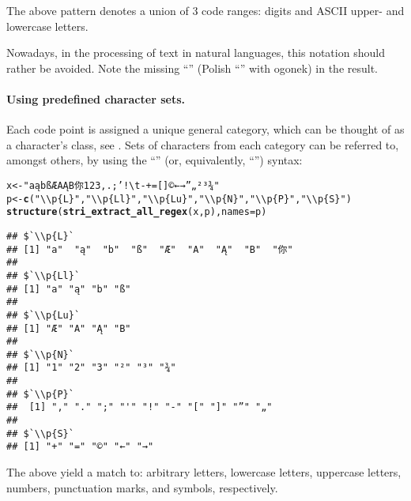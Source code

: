 \documentclass[nojss]{jss}\usepackage[]{graphicx}\usepackage[]{xcolor}
\makeatletter
\newcommand{\hlstr}[1]{\textcolor[rgb]{0.192,0.494,0.8}{#1}}%
\newcommand{\hlstd}[1]{\textcolor[rgb]{0.345,0.345,0.345}{#1}}%
\newcommand{\hlkwb}[1]{\textcolor[rgb]{0.69,0.353,0.396}{#1}}%
\newcommand{\hlkwc}[1]{\textcolor[rgb]{0.333,0.667,0.333}{#1}}%
\newcommand{\hlkwd}[1]{\textcolor[rgb]{0.737,0.353,0.396}{\textbf{#1}}}%
\newenvironment{kframe}{%
 \def\at@end@of@kframe{}%
 \ifinner\ifhmode%
  \def\at@end@of@kframe{\end{minipage}}%
  \begin{minipage}{\columnwidth}%
 \fi\fi%
 \def\FrameCommand##1{\hskip\@totalleftmargin \hskip-\fboxsep
 \colorbox{shadecolor}{##1}\hskip-\fboxsep
     \hskip-\linewidth \hskip-\@totalleftmargin \hskip\columnwidth}%
 \MakeFramed {\advance\hsize-\width
   \@totalleftmargin\z@ \linewidth\hsize
   \@setminipage}}%
 {\par\unskip\endMakeFramed%
 \at@end@of@kframe}
\newenvironment{knitrout}{}{} %
\makeatother
\begin{document}
The above pattern denotes a union of 3 code ranges:
digits and ASCII upper- and lowercase letters.

Nowadays, in the processing of text in natural languages, this
notation should rather be avoided. Note the missing ``''
(Polish ``'' with ogonek) in the result.


\paragraph{Using predefined character sets.}
Each code point is assigned a unique general category,
which can be thought of as a character's class,
see \citep{usa44:ucd}.
Sets of characters from each category can be referred to,
amongst others, by using the ``''
(or, equivalently, ``'') syntax:

\begin{knitrout}
\color{fgcolor}\begin{kframe}
\begin{alltt}
\hlstd{x} \hlkwb{<-} \hlstr{"aąbßÆAĄB你123,.;'! \textbackslash{}t-+=[]©←→”„²³¾"}
\hlstd{p} \hlkwb{<-} \hlkwd{c}\hlstd{(}\hlstr{"\textbackslash{}\textbackslash{}p\{L\}"}\hlstd{,} \hlstr{"\textbackslash{}\textbackslash{}p\{Ll\}"}\hlstd{,} \hlstr{"\textbackslash{}\textbackslash{}p\{Lu\}"}\hlstd{,} \hlstr{"\textbackslash{}\textbackslash{}p\{N\}"}\hlstd{,} \hlstr{"\textbackslash{}\textbackslash{}p\{P\}"}\hlstd{,} \hlstr{"\textbackslash{}\textbackslash{}p\{S\}"}\hlstd{)}
\hlkwd{structure}\hlstd{(}\hlkwd{stri_extract_all_regex}\hlstd{(x, p),} \hlkwc{names}\hlstd{=p)}
\end{alltt}
\begin{verbatim}
## $`\\p{L}`
## [1] "a"  "ą"  "b"  "ß"  "Æ"  "A"  "Ą"  "B"  "你"
## 
## $`\\p{Ll}`
## [1] "a" "ą" "b" "ß"
## 
## $`\\p{Lu}`
## [1] "Æ" "A" "Ą" "B"
## 
## $`\\p{N}`
## [1] "1" "2" "3" "²" "³" "¾"
## 
## $`\\p{P}`
##  [1] "," "." ";" "'" "!" "-" "[" "]" "”" "„"
## 
## $`\\p{S}`
## [1] "+" "=" "©" "←" "→"
\end{verbatim}
\end{kframe}
\end{knitrout}

The above yield a match to: arbitrary letters, lowercase letters, uppercase letters,
numbers, punctuation marks, and symbols, respectively.
\end{document}

